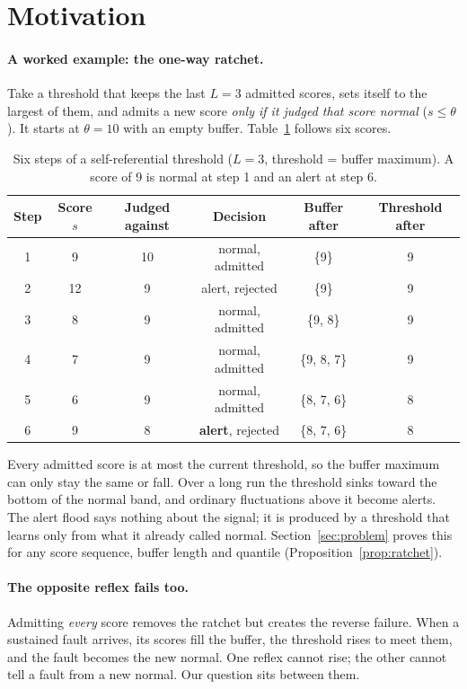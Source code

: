 \section{Motivation}\label{sec:motivation}

\paragraph{A worked example: the one-way ratchet.}
Take a threshold that keeps the last $L=3$ admitted scores, sets itself to the largest
of them, and admits a new score \emph{only if it judged that score normal}
($s \le \theta$). It starts at $\theta=10$ with an empty buffer.
Table~\ref{tab:ratchet-example} follows six scores.

\begin{table}[H]
  \centering
  \caption{Six steps of a self-referential threshold ($L=3$, threshold = buffer
  maximum). A score of 9 is normal at step 1 and an alert at step 6.}
  \label{tab:ratchet-example}
  \small
  \begin{tabular}{@{}cccccc@{}}
    \toprule
    Step & Score $s$ & Judged against & Decision & Buffer after & Threshold after\\
    \midrule
    1 & 9  & 10 & normal, admitted  & \{9\}      & 9\\
    2 & 12 & 9  & alert, rejected   & \{9\}      & 9\\
    3 & 8  & 9  & normal, admitted  & \{9, 8\}   & 9\\
    4 & 7  & 9  & normal, admitted  & \{9, 8, 7\} & 9\\
    5 & 6  & 9  & normal, admitted  & \{8, 7, 6\} & 8\\
    6 & 9  & 8  & \textbf{alert}, rejected & \{8, 7, 6\} & 8\\
    \bottomrule
  \end{tabular}
\end{table}

Every admitted score is at most the current threshold, so the buffer maximum can only
stay the same or fall. Over a long run the threshold sinks toward the bottom of the
normal band, and ordinary fluctuations above it become alerts. The alert flood says
nothing about the signal; it is produced by a threshold that learns only from what it
already called normal. Section~\ref{sec:problem} proves this for any score sequence,
buffer length and quantile (Proposition~\ref{prop:ratchet}).

\paragraph{The opposite reflex fails too.}
Admitting \emph{every} score removes the ratchet but creates the reverse failure. When a
sustained fault arrives, its scores fill the buffer, the threshold rises to meet them,
and the fault becomes the new normal. One reflex cannot rise; the other cannot tell a
fault from a new normal. Our question sits between them.

